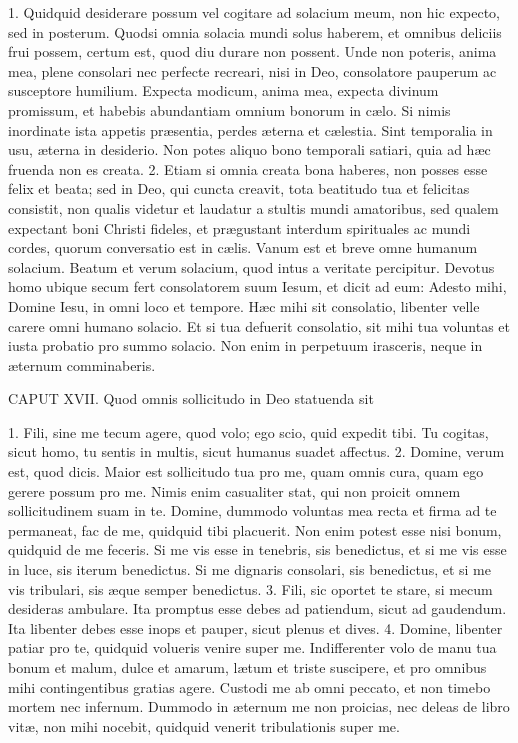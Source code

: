 1. Quidquid desiderare possum vel cogitare ad solacium meum, non hic expecto, sed in posterum. Quodsi omnia solacia mundi solus haberem, et omnibus deliciis frui possem, certum est, quod diu durare non possent. Unde non poteris, anima mea, plene consolari nec perfecte recreari, nisi in Deo, consolatore pauperum ac susceptore humilium. Expecta modicum, anima mea, expecta divinum promissum, et habebis abundantiam omnium bonorum in cælo. Si nimis inordinate ista appetis præsentia, perdes æterna et cælestia. Sint temporalia in usu, æterna in desiderio. Non potes aliquo bono temporali satiari, quia ad hæc fruenda non es creata.
2. Etiam si omnia creata bona haberes, non posses esse felix et beata; sed in Deo, qui cuncta creavit, tota beatitudo tua et felicitas consistit, non qualis videtur et laudatur a stultis mundi amatoribus, sed qualem expectant boni Christi fideles, et prægustant interdum spirituales ac mundi cordes, quorum conversatio est in cælis. Vanum est et breve omne humanum solacium. Beatum et verum solacium, quod intus a veritate percipitur. Devotus homo ubique secum fert consolatorem suum Iesum, et dicit ad eum: Adesto mihi, Domine Iesu, in omni loco et tempore. Hæc mihi sit consolatio, libenter velle carere omni humano solacio. Et si tua defuerit consolatio, sit mihi tua voluntas et iusta probatio pro summo solacio. Non enim in perpetuum irasceris, neque in æternum comminaberis.


CAPUT XVII.
Quod omnis sollicitudo in Deo statuenda sit

1. Fili, sine me tecum agere, quod volo; ego scio, quid expedit tibi. Tu cogitas, sicut homo, tu sentis in multis, sicut humanus suadet affectus.
2. Domine, verum est, quod dicis. Maior est sollicitudo tua pro me, quam omnis cura, quam ego gerere possum pro me. Nimis enim casualiter stat, qui non proicit omnem sollicitudinem suam in te. Domine, dummodo voluntas mea recta et firma ad te permaneat, fac de me, quidquid tibi placuerit. Non enim potest esse nisi bonum, quidquid de me feceris. Si me vis esse in tenebris, sis benedictus, et si me vis esse in luce, sis iterum benedictus. Si me dignaris consolari, sis benedictus, et si me vis tribulari, sis æque semper benedictus.
3. Fili, sic oportet te stare, si mecum desideras ambulare. Ita promptus esse debes ad patiendum, sicut ad gaudendum. Ita libenter debes esse inops et pauper, sicut plenus et dives.
4. Domine, libenter patiar pro te, quidquid volueris venire super me. Indifferenter volo de manu tua bonum et malum, dulce et amarum, lætum et triste suscipere, et pro omnibus mihi contingentibus gratias agere. Custodi me ab omni peccato, et non timebo mortem nec infernum. Dummodo in æternum me non proicias, nec deleas de libro vitæ, non mihi nocebit, quidquid venerit tribulationis super me.


